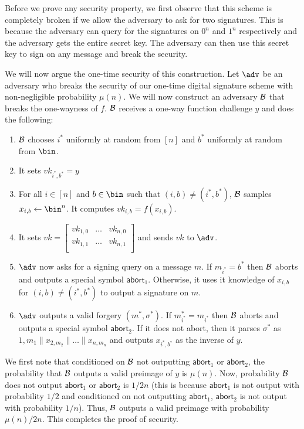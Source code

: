 \documentclass[12pt]{tufte-book}
\newcommand{\abort}{\mathsf{abort}}
\begin{document}
Before we prove any security property, we first observe that this scheme is completely broken if we allow the adversary to ask for two signatures. This is because the adversary can query for the signatures on $0^n$ and $1^n$ respectively and the adversary gets the entire secret key. The adversary can then use this secret key to sign on any message and break the security. 

We will now argue the one-time security of this construction. Let $\adv$ be an adversary who breaks the security of our one-time digital signature scheme with non-negligible probability $\mu(n)$. We will now construct an adversary $\mathcal{B}$ that breaks the one-wayness of $f$. $\mathcal{B}$ receives a one-way function challenge $y$ and does the following:
\begin{enumerate}
    \item $\mathcal{B}$ chooses $i^*$ uniformly at random from $[n]$ and $b^*$ uniformly at random from $\bin$.
    \item It sets $vk_{i^*,b^*} = y$
    \item For all $i \in [n]$ and $b \in \bin$ such that $(i,b) \neq (i^*,b^*)$, $\mathcal{B}$ samples $x_{i,b} \gets \bin^n$. It computes $vk_{i,b} = f(x_{i,b})$.
    \item It sets $vk = \left[ \begin{array}{ccc}
vk_{1,0} & \ldots& vk_{n,0} \\
vk_{1,1} & \ldots& vk_{n,1} \\
\end{array} \right]$ and sends $vk$ to $\adv$.
\item $\adv$ now asks for a signing query on a message $m$. If $m_{i^*} = b^*$ then $\mathcal{B}$ aborts and outputs a special symbol $\abort_1$. Otherwise, it uses it knowledge of $x_{i,b}$ for $(i,b) \neq (i^*,b^*)$ to output a signature on $m$.
\item $\adv$ outputs a valid forgery $(m^*,\sigma^*)$. If $m^*_{i^*} = m_{i^*}$ then $\mathcal{B}$ aborts and outputs a special symbol $\abort_2$. If it does not abort, then it parses $\sigma^*$ as ${1,m_1}\|x_{2,m_2}\| \ldots \| x_{n,m_n}$ and outputs $x_{i^*,b^*}$ as the inverse of $y$.
\end{enumerate}
We first note that conditioned on $\mathcal{B}$ not outputting $\abort_1$ or $\abort_2$, the probability that $\mathcal{B}$ outputs a valid preimage of $y$ is $\mu(n)$. Now, probability $\mathcal{B}$ does not output $\abort_1$ or $\abort_2$ is $1/2n$ (this is because $\abort_1$ is not output with probability $1/2$ and conditioned on not outputting $\abort_1$, $\abort_2$ is not output with probability $1/n$). Thus, $\mathcal{B}$ outputs a valid preimage with probability $\mu(n)/2n$. This completes the proof of security.
\end{document}
